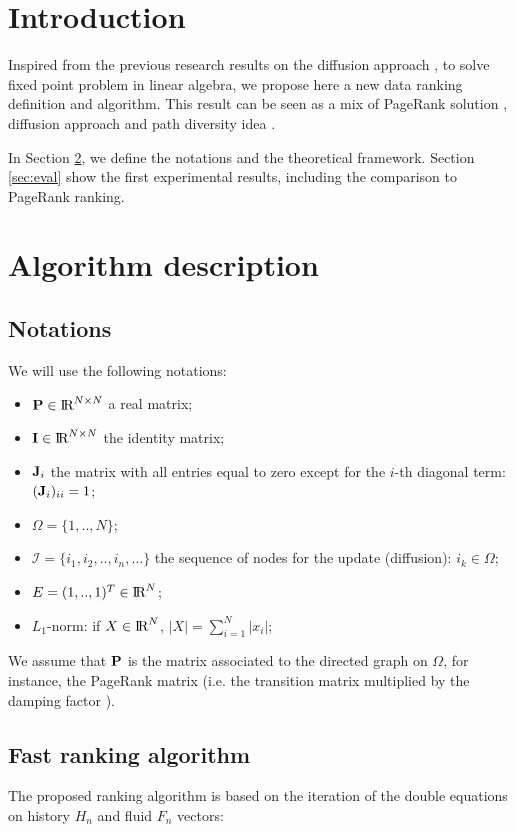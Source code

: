 \documentclass[conference]{IEEEtran}
\newcommand\II{\mathcal{I}}
\def\R{\mbox{I\hspace{-.15em}R}}
\def\R{\mbox{I\hspace{-.15em}R}}
\def\Pb{\bold{P}}
\def\Ib{\bold{I}}
\def\Jb{\bold{J}}
\begin{document}
\begin{psfrags}
\section{Introduction}\label{sec:intro}
Inspired from the previous research results on the diffusion approach \cite{d-algo}, \cite{cv}
to solve fixed point problem in linear algebra, we propose here a new data ranking definition
and algorithm. This result can be seen as a mix of PageRank solution \cite{page}, diffusion approach
\cite{d-algo} and path diversity idea \cite{diversity}.

In Section \ref{sec:def}, we define the notations and the theoretical framework. 
Section \ref{sec:eval} show the first experimental results, including the comparison
to PageRank ranking.
\section{Algorithm description}\label{sec:def}
\subsection{Notations}

We will use the following notations:
\begin{itemize}
\item $\Pb \in \R^{N\times N}$ a real matrix;
\item $\Ib\in \R^{N\times N}$ the identity matrix;
\item $\Jb_i$ the matrix with all entries equal to zero except for
  the $i$-th diagonal term: $(\Jb_i)_{ii} = 1$;
\item $\Omega = \{1,..,N\}$;
\item $\II = \{i_1,i_2,..,i_n,...\}$ the sequence of nodes for the update
  (diffusion): $i_k \in \Omega$;
\item $E = (1,..,1)^T \in \R^N$;
\item $L_1$-norm: if $X\in \R^N$, $|X| = \sum_{i=1}^N |x_i|$;
\end{itemize}

We assume that $\Pb$ is the matrix associated to the directed graph on $\Omega$,
for instance, the PageRank matrix (i.e. the transition matrix multiplied by the
damping factor \cite{page}).

\subsection{Fast ranking algorithm}
The proposed ranking algorithm is based on the iteration of the double equations
on history $H_n$ and fluid $F_n$ vectors:


\end{psfrags}
\end{document}
